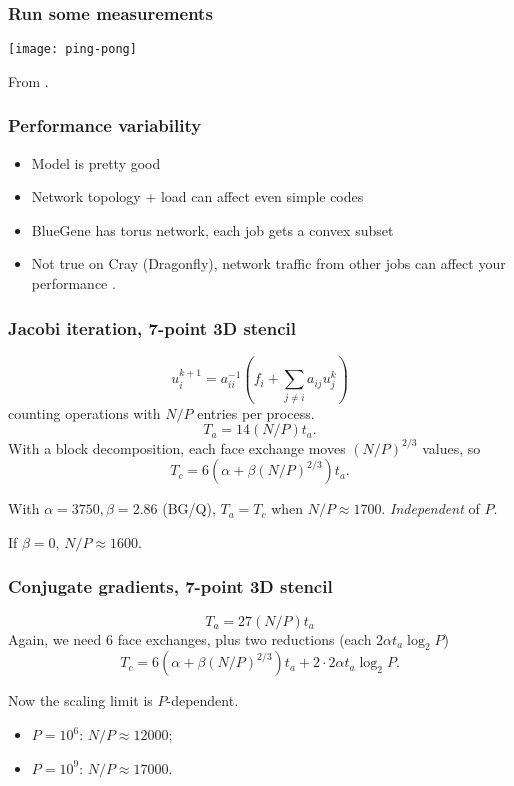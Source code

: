 \documentclass[presentation]{beamer}
\begin{document}
\begin{frame}
  \frametitle{Run some measurements}
  \begin{center}
    \texttt{[image: ping-pong]}
  \end{center}
  From \textcite{Fischer:2015}.
\end{frame}

\begin{frame}
  \frametitle{Performance variability}
  \begin{itemize}
  \item Model is pretty good
  \item Network topology + load can affect even simple codes
  \item BlueGene has torus network, each job gets a convex subset
  \item Not true on Cray (Dragonfly), network traffic
    from other jobs can affect your performance \parencite{Prisacari:2014}.
  \end{itemize}
\end{frame}

\begin{frame}
  \frametitle{Jacobi iteration, 7-point 3D stencil}
  \begin{equation*}
    u_i^{k+1} = a_{ii}^{-1}\left(f_i + \sum_{j \ne i} a_{ij}u_j^{k}\right)
  \end{equation*}
  counting operations with $N/P$ entries per process.
  \begin{equation*}
    T_a = 14(N/P)t_a.
  \end{equation*}
  With a block decomposition, each face exchange moves $(N/P)^{2/3}$
  values, so
  \begin{equation*}
    T_c = 6 \left(\alpha + \beta (N/P)^{2/3}\right)t_a.
  \end{equation*}

  With $\alpha = 3750, \beta = 2.86$ (BG/Q), $T_a = T_c$ when $N/P
  \approx 1700$.  \emph{Independent} of $P$.

  If $\beta = 0$, $N/P \approx 1600$.
\end{frame}


\begin{frame}
  \frametitle{Conjugate gradients, 7-point 3D stencil}
  \begin{equation*}
    T_a = 27(N/P) t_a
  \end{equation*}
  Again, we need 6 face exchanges, plus two reductions (each $2\alpha t_a \log_2 P$)
  \begin{equation*}
    T_c = 6 \left(\alpha + \beta (N/P)^{2/3}\right)t_a + 2 \cdot 2
    \alpha t_a \log_2 P.
  \end{equation*}

  Now the scaling limit is $P$-dependent.

  \begin{itemize}
    \item $P=10^6$: $N/P \approx 12000$;
    \item $P=10^9$: $N/P \approx 17000$.
  \end{itemize}
\end{frame}
\end{document}

